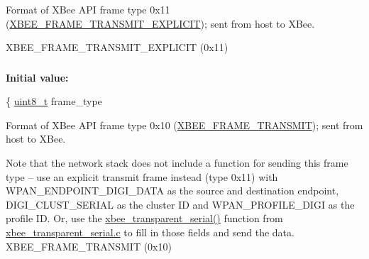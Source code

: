 Format of X\-Bee A\-P\-I frame type 0x11 (\hyperlink{group__xbee__device_gga7753bbebaf00d6d64942f64b6ae9b7b9aa673474f9f3597929def38ad4cf7d63e}{X\-B\-E\-E\-\_\-\-F\-R\-A\-M\-E\-\_\-\-T\-R\-A\-N\-S\-M\-I\-T\-\_\-\-E\-X\-P\-L\-I\-C\-I\-T}); sent from host to X\-Bee. 

X\-B\-E\-E\-\_\-\-F\-R\-A\-M\-E\-\_\-\-T\-R\-A\-N\-S\-M\-I\-T\-\_\-\-E\-X\-P\-L\-I\-C\-I\-T (0x11) \hypertarget{group__xbee__wpan_ga02e02911588cbafc0befb9b9da8961e6}{
\subsubsection[{xbee\-\_\-header\-\_\-transmit\-\_\-t}]{}}\label{group__xbee__wpan_ga02e02911588cbafc0befb9b9da8961e6}
{\bfseries Initial value\-:}
\begin{DoxyCode}
\{
   \hyperlink{group__hal_gae1affc9ca37cfb624959c866a73f83c2}{uint8\_t}       frame\_type
\end{DoxyCode}


Format of X\-Bee A\-P\-I frame type 0x10 (\hyperlink{group__xbee__device_gga7753bbebaf00d6d64942f64b6ae9b7b9a5215c258e8db6c292b9e52ca26011ed1}{X\-B\-E\-E\-\_\-\-F\-R\-A\-M\-E\-\_\-\-T\-R\-A\-N\-S\-M\-I\-T}); sent from host to X\-Bee. 

Note that the network stack does not include a function for sending this frame type -- use an explicit transmit frame instead (type 0x11) with W\-P\-A\-N\-\_\-\-E\-N\-D\-P\-O\-I\-N\-T\-\_\-\-D\-I\-G\-I\-\_\-\-D\-A\-T\-A as the source and destination endpoint, D\-I\-G\-I\-\_\-\-C\-L\-U\-S\-T\-\_\-\-S\-E\-R\-I\-A\-L as the cluster I\-D and W\-P\-A\-N\-\_\-\-P\-R\-O\-F\-I\-L\-E\-\_\-\-D\-I\-G\-I as the profile I\-D. Or, use the \hyperlink{group__xbee__transparent_gafbf9e5ccdb17be373012bd690a76e570}{xbee\-\_\-transparent\-\_\-serial()} function from \hyperlink{xbee__transparent__serial_8c}{xbee\-\_\-transparent\-\_\-serial.\-c} to fill in those fields and send the data. X\-B\-E\-E\-\_\-\-F\-R\-A\-M\-E\-\_\-\-T\-R\-A\-N\-S\-M\-I\-T (0x10) 

